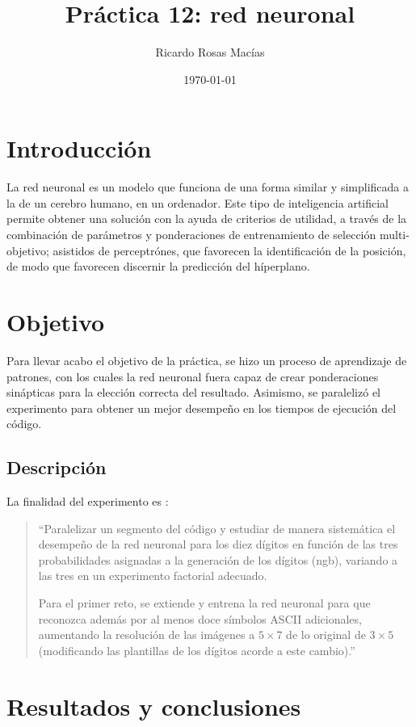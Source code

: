 \documentclass[12pt, letterpaper] {article}
\author{Ricardo Rosas Macías}
\title{Práctica 12: red neuronal}
\date{\today}
\begin{document}
\maketitle


\section{Introducción}
La red neuronal es un modelo que funciona de una forma similar y simplificada a la de un cerebro humano, en un ordenador. Este tipo de inteligencia artificial permite obtener una solución con la ayuda de criterios de utilidad, a través de la combinación de parámetros y ponderaciones de entrenamiento de selección multi-objetivo; asistidos de perceptrónes, que favorecen la identificación de la posición, de modo que favorecen discernir la predicción del híperplano. 

 \section{Objetivo}
Para llevar acabo el objetivo de la práctica, se hizo un proceso de aprendizaje de patrones, con los cuales la red neuronal fuera capaz de crear ponderaciones sinápticas para la elección correcta del resultado. Asimismo, se paralelizó el experimento para obtener un mejor desempeño en los tiempos de ejecución del código.
 
 \subsection{Descripción}
 
La finalidad del experimento es \cite{elisawebRN}:
\begin{quotation}
 ``Paralelizar un segmento del código y estudiar de manera sistemática el desempeño de la red neuronal para los diez dígitos en función de las tres probabilidades asignadas a la generación de los dígitos (ngb), variando a las tres en un experimento factorial adecuado.

Para el primer reto, se extiende y entrena la red neuronal para que reconozca además por al menos doce símbolos ASCII adicionales, aumentando la resolución de las imágenes a $5\times7$ de lo original de $3\times5$ (modificando las plantillas de los dígitos acorde a este cambio).''
\end{quotation}

\section{Resultados y conclusiones}
\end{document}
